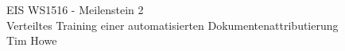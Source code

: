 \documentclass[11pt,oneside,a4paper,notitlepage]{book}
\newcommand{\brand}{TaARs }
\begin{document}
\begin{center}
\Large{EIS WS1516 - Meilenstein 2}\\[3mm]
\normalsize{Verteiltes Training einer automatisierten Dokumentenattributierung}\\[3mm]
\normalsize{Tim Howe}
\end{center}


\tableofcontents


\newpage

\begin{comment}
Die Projektbegründungen sind jene Begründungen, die Bezug nehmen auf jegliche Entscheidungen, die im Projekt getroffen werden. Es sind somit projektspezifische Begründungen. Darin sollten Alternativen abgewägt werden und Inhalte auf den Punkt gebracht werden, sodass "Totes Wissen" eliminiert wird. Ein roter Faden sollte ersichtlich sein. Als Referenz dienen jeweilige Artefakte, die in dem Projekt entwickelt worden sind und demnach begründet werden müssen. 
\end{comment}


\newpage

\newpage

\newpage

%
\newpage



%
%
%
\end{document}
